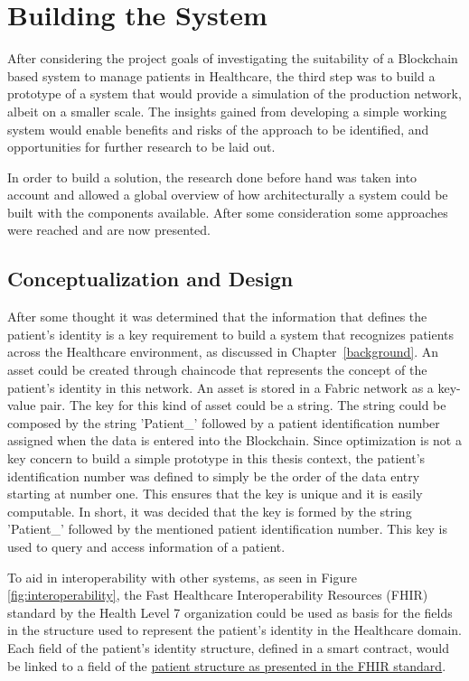 \section{Building the System}

After considering the project goals of investigating the suitability of a
Blockchain based system to manage patients in Healthcare, the third step was to
build a prototype of a system that would provide a simulation of the production
network, albeit on a smaller scale. The insights gained from developing a
simple working system would enable benefits and risks of the approach to be
identified, and opportunities for further research to be laid out.

In order to build a solution, the research done before hand was taken into
account and allowed a global overview of how architecturally a system could be
built with the components available. After some consideration some approaches
were reached and are now presented.

\subsection{Conceptualization and Design}

After some thought it was determined that the information that defines the
patient's identity is a key requirement to build a system that recognizes
patients across the Healthcare environment, as discussed in
Chapter~\ref{background}. An asset could be created through chaincode that
represents the concept of the patient's identity in this network. An asset is
stored in a Fabric network as a key-value pair. The key for this kind of asset
could be a string. The string could be composed by the string 'Patient\_'
followed by a patient identification number assigned when the data is entered
into the Blockchain. Since optimization is not a key concern to build a simple
prototype in this thesis context, the patient's identification number was
defined to simply be the order of the data entry starting at number one. This
ensures that the key is unique and it is easily computable. In short, it was
decided that the key is formed by the string 'Patient\_' followed by the
mentioned patient identification number. This key is used to query and access
information of a patient.

To aid in interoperability with other systems, as seen in Figure
\ref{fig:interoperability}, the Fast Healthcare Interoperability Resources
(FHIR) standard by the Health Level 7 organization could be used as basis for
the fields in the structure used to represent the patient's identity in the
Healthcare domain.  Each field of the patient's identity structure, defined in
a smart contract, would be linked to a field of the
\href{http://www.hl7.org/fhir/patient.html}{patient structure as presented in
the FHIR standard}.

